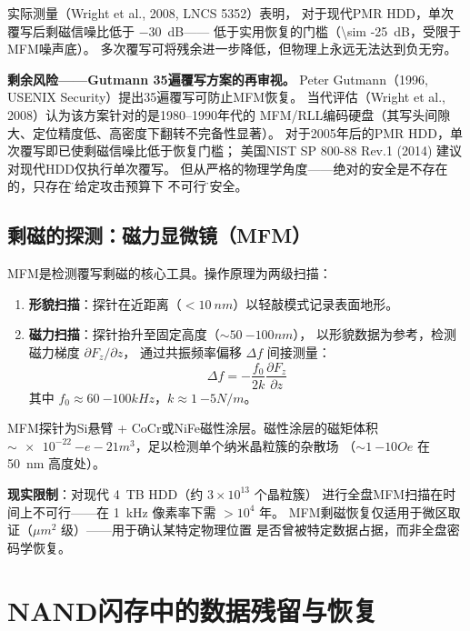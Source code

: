 \documentclass[11pt,a4paper,twoside]{article}
\theoremstyle{definition}\newtheorem{definition}{定义}[section]
\theoremstyle{plain}\newtheorem{theorem}{定理}[section]
\theoremstyle{remark}\newtheorem{remark}{注解}[section]
\begin{document}
实际测量（Wright et al., 2008, LNCS 5352）表明，
对于现代PMR HDD，单次覆写后剩磁信噪比低于 \SI{-30}{dB}——
低于实用恢复的门槛（\SI{\sim -25}{dB}，受限于MFM噪声底）。
多次覆写可将残余进一步降低，但物理上永远无法达到负无穷。

\begin{physbox}
  \textbf{剩余风险——Gutmann 35遍覆写方案的再审视。}
  Peter Gutmann（1996, USENIX Security）提出35遍覆写可防止MFM恢复。
  当代评估（Wright et al., 2008）认为该方案针对的是1980--1990年代的
  MFM/RLL编码硬盘（其写头间隙大、定位精度低、高密度下翻转不完备性显著）。
  对于2005年后的PMR HDD，单次覆写即已使剩磁信噪比低于恢复门槛；
  美国NIST SP 800-88 Rev.1 (2014) 建议对现代HDD仅执行单次覆写。
  但从严格的物理学角度——绝对的安全是不存在的，只存在\"在给定攻击预算下
  不可行\"的安全。
\end{physbox}

\subsection{剩磁的探测：磁力显微镜（MFM）}

MFM是检测覆写剩磁的核心工具。操作原理为两级扫描：
\begin{enumerate}
  \item \textbf{形貌扫描}：探针在近距离（$< \SI{10}{nm}$）以轻敲模式记录表面地形。
  \item \textbf{磁力扫描}：探针抬升至固定高度（$\sim \SI{50}{-100}{nm}$），
  以形貌数据为参考，检测磁力梯度 $\partial F_z/\partial z$，
  通过共振频率偏移 $\Delta f$ 间接测量：
  \begin{equation}\label{eq:mfm}
    \Delta f = -\frac{f_0}{2k} \frac{\partial F_z}{\partial z}
  \end{equation}
  其中 $f_0 \approx \SI{60}{-100}{kHz}$，$k \approx \SI{1}{-5}{N/m}$。
\end{enumerate}

MFM探针为Si悬臂 + CoCr或NiFe磁性涂层。磁性涂层的磁矩体积
$\sim \SI{e-22}{-e-21}{m^3}$，足以检测单个纳米晶粒簇的杂散场
（$\sim \SI{1}{-10}{Oe}$ 在 \SI{50}{nm} 高度处）。

\textbf{现实限制}：对现代 \SI{4}{TB} HDD（约 $3 \times 10^{13}$ 个晶粒簇）
进行全盘MFM扫描在时间上不可行——在 \SI{1}{kHz} 像素率下需 $>10^4$ 年。
MFM剩磁恢复仅适用于微区取证（$\si{\mu m}^2$ 级）——用于确认某特定物理位置
是否曾被特定数据占据，而非全盘密码学恢复。

\section{NAND闪存中的数据残留与恢复}
\label{sec:nand}
\end{document}
